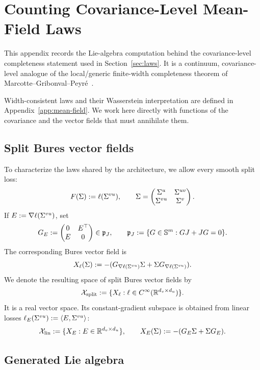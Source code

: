 
\section{Counting Covariance-Level Mean-Field Laws}
\label{app:law-counting}

This appendix records the Lie-algebra computation behind the covariance-level
completeness statement used in Section~\ref{sec:laws}.
It is a continuum, covariance-level analogue of the local/generic finite-width
completeness theorem of Marcotte--Gribonval--Peyr\'e~\cite{MarcotteGribonvalPeyre2023}.

Width-consistent laws and their Wasserstein interpretation are defined
in Appendix~\ref{app:mean-field}. We work here directly with functions
of the covariance and the vector fields that must annihilate them.

\subsection{Split Bures vector fields}
\label{subsec:split-bures-fields}

To characterize the laws shared by the architecture, we allow every
smooth split loss:
\[
F(\Sigma):=\ell(\Sigma^{vu}),
\qquad
\Sigma=
\begin{pmatrix}
\Sigma^u&\Sigma^{uv}\\
\Sigma^{vu}&\Sigma^v
\end{pmatrix}.
\]
If \(E:=\nabla \ell(\Sigma^{vu})\), set
\[
G_E:=
\begin{pmatrix}
0&E^\top\\
E&0
\end{pmatrix}\in\mathfrak p_J,
\qquad
\mathfrak p_J:=\{G\in\mathbb{S}^m:GJ+JG=0\}.
\]
The corresponding Bures vector field is
\begin{equation}
\label{eq:appendix-split-vector-field}
X_\ell(\Sigma):=-(G_{\nabla \ell(\Sigma^{vu})}\Sigma+\Sigma G_{\nabla \ell(\Sigma^{vu})}).
\end{equation}
We denote the resulting space of split Bures vector fields by
\[
\mathcal X_{\rm split}
:=
\{X_\ell:\ell\in C^\infty(\mathbb{R}^{d_v\times d_u})\}.
\]
It is a real vector space.  Its constant-gradient subspace is obtained from
linear losses \(\ell_E(\Sigma^{vu}):=\left\langle E,\Sigma^{vu} \right\rangle\):
\[
\mathcal X_{\rm lin}
:=
\{X_E:E\in\mathbb{R}^{d_v\times d_u}\},
\qquad
X_E(\Sigma):=-(G_E\Sigma+\Sigma G_E).
\]

\subsection{Generated Lie algebra}

